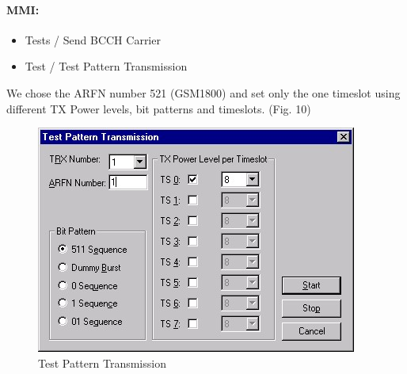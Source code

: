 \documentclass[english]{article}
\begin{document}
\paragraph{MMI:}
\begin{itemize}
\item Tests / Send BCCH Carrier
\item Test / Test Pattern Transmission
\end{itemize}
We chose the ARFN number 521 (GSM1800) and set only the one timeslot using different TX Power levels, bit patterns and timeslots. (Fig. 10)
\begin{figure}
\centerline{\includegraphics[scale=0.8]{GSM/Pic10}}
\caption{Test Pattern Transmission}
\end{figure}
\end{document}
